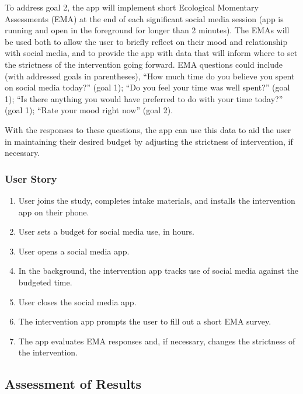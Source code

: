 \documentclass[
  man]{apa6}
\begin{document}
To address goal 2, the app will implement short Ecological Momentary Assessments (EMA)
at the end of each significant social media session (app is running and open
in the foreground for longer than 2 minutes). The EMAs will be used both to allow the user to briefly
reflect on their mood and relationship with social media, and to provide the
app with data that will inform where to set the strictness of the intervention
going forward. EMA questions could include (with addressed goals in parentheses),
``How much time do you believe you spent on social media today?'' (goal 1); ``Do you feel your time was well spent?'' (goal 1); ``Is there anything you would have preferred to do with your time today?'' (goal 1); ``Rate your mood right now'' (goal 2).

With the responses to these questions, the app can use this data to aid the user in maintaining their
desired budget by adjusting the strictness of intervention, if necessary.

\hypertarget{user-story}{%
\subsubsection{User Story}\label{user-story}}

\begin{enumerate}
\def\labelenumi{\arabic{enumi}.}
\setcounter{enumi}{-1}
\item
  User joins the study, completes intake materials, and installs the intervention
  app on their phone.
\item
  User sets a budget for social media use, in hours.
\item
  User opens a social media app.
\item
  In the background, the intervention app tracks use of social media against the
  budgeted time.
\item
  User closes the social media app.
\item
  The intervention app prompts the user to fill out a short EMA survey.
\item
  The app evaluates EMA responses and, if necessary, changes the strictness
  of the intervention.
\end{enumerate}

\hypertarget{assessment-of-results}{%
\subsection{Assessment of Results}\label{assessment-of-results}}
\end{document}

